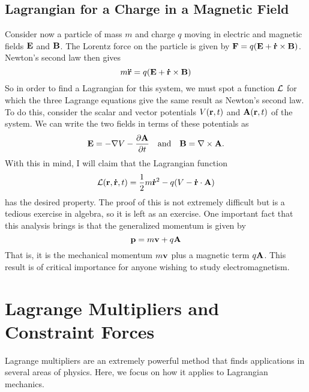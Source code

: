 \subsection*{Lagrangian for a Charge in a Magnetic Field}
Consider now a particle of mass $m$ and charge $q$ moving in electric and magnetic fields $\mathbf{E}$ and $\mathbf{B}$. The Lorentz force on the particle is given by $\mathbf{F} = q(\mathbf{E} + \mathbf{\dot r}\times \mathbf{B})$. Newton's second law then gives
\[ m \mathbf{\ddot r} = q(\mathbf{E} + \mathbf{\dot r}\times \mathbf{B}) \]
So in order to find a Lagrangian for this system, we must spot a function $\mathcal{L}$ for which the three Lagrange equations give the same result as Newton's second law. To do this, consider the scalar and vector potentials $V(\mathbf{r}, t)$ and $\mathbf{A}(\mathbf{r}, t)$ of the system. We can write the two fields in terms of these potentials as
\[ \mathbf{E} = -\nabla V - \pdv{\mathbf{A}}{t} \quad\text{and}\quad \mathbf{B} = \nabla \times \mathbf{A}.\]
With this in mind, I will claim that the Lagrangian function
\[ \mathcal{L}(\mathbf{r}, \mathbf{\dot r}, t) = \frac{1}{2}m\mathbf{\dot r}^2 - q(V - \mathbf{\dot r}\cdot \mathbf{A})\]
has the desired property. The proof of this is not extremely difficult but is a tedious exercise in algebra, so it is left as an exercise. One important fact that this analysis brings is that the generalized momentum is given by
\[ \mathbf{p} = m\mathbf{v} + q\mathbf{A}\]
That is, it is the mechanical momentum $m\mathbf{v}$ plus a magnetic term $q\mathbf{A}$. This result is of critical importance for anyone wishing to study electromagnetism.
\section{Lagrange Multipliers and Constraint Forces}
Lagrange multipliers are an extremely powerful method that finds applications in several areas of physics. Here, we focus on how it applies to Lagrangian mechanics. 

